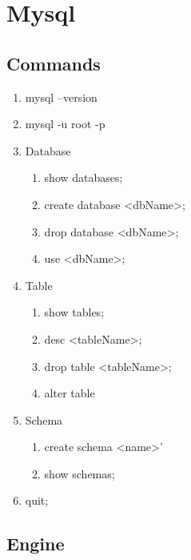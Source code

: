 \section{Mysql}
    
    \subsection{Commands}
    \begin{enumerate}
        \item \colorbox{gray!30}{mysql --version}
        \item \colorbox{gray!30}{mysql -u root -p}
        \item Database
            \begin{enumerate}
                \item \colorbox{gray!30}{show databases;}
                \item \colorbox{gray!30}{create database <dbName>;}
                \item \colorbox{gray!30}{drop database <dbName>;}
                \item \colorbox{gray!30}{use <dbName>;}
            \end{enumerate}
        \item Table
            \begin{enumerate}
                \item \colorbox{gray!30}{show tables;}
                \item \colorbox{gray!30}{desc <tableName>;}
                \item \colorbox{gray!30}{drop table <tableName>;}
                \item \colorbox{gray!30}{alter table}
            \end{enumerate}
        \item Schema
            \begin{enumerate}
                \item \colorbox{gray!30}{create schema <name>'}
                \item \colorbox{gray!30}{show schemas;}
            \end{enumerate}
        \item \colorbox{gray!30}{quit;}
    \end{enumerate}
    
    \subsection{Engine}
    
